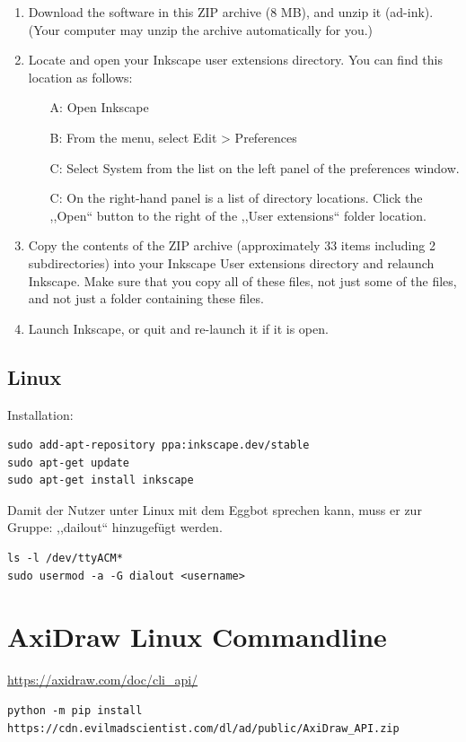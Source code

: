 \begin{enumerate}
  \item         Download the software in this ZIP archive (8 MB), and unzip it (ad-ink). (Your computer may unzip the archive automatically for you.)
  \item         Locate and open your Inkscape user extensions directory. You can find this location as follows:\begin{itemize}
  \item[A:]               Open Inkscape
  \item[B:]               From the menu, select Edit > Preferences
  \item[C:]               Select System from the list on the left panel of the preferences window.
  \item[C:]               On the right-hand panel is a list of directory locations. Click the ,,Open`` button to the right of the ,,User extensions`` folder location.
  \end{itemize}
  \item         Copy the contents of the ZIP archive (approximately 33 items including 2 subdirectories) into your Inkscape User extensions directory and relaunch Inkscape. Make sure that you copy all of these files, not just some of the files, and not just a folder containing these files.
  \item         Launch Inkscape, or quit and re-launch it if it is open.
\end{enumerate}

\subsection{Linux}
Installation:
\begin{verbatim}
sudo add-apt-repository ppa:inkscape.dev/stable
sudo apt-get update
sudo apt-get install inkscape
\end{verbatim}

Damit der Nutzer unter Linux mit dem Eggbot sprechen kann, muss er zur Gruppe: ,,dailout`` hinzugefügt werden.\\
\begin{verbatim}
ls -l /dev/ttyACM*
sudo usermod -a -G dialout <username>
\end{verbatim}
\section{AxiDraw Linux Commandline}
\url{https://axidraw.com/doc/cli_api/}
\begin{verbatim}
python -m pip install https://cdn.evilmadscientist.com/dl/ad/public/AxiDraw_API.zip
\end{verbatim}




